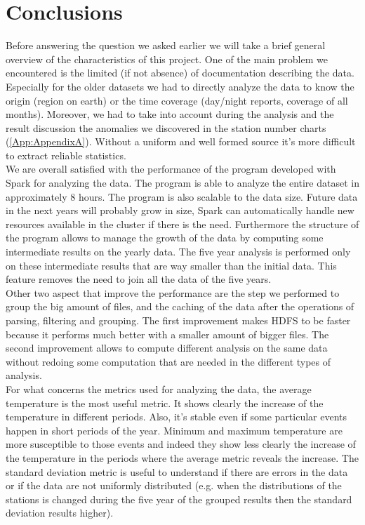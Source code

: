 \documentclass{vldb}
\begin{document}
\section{Conclusions}
\label{sec:con}
Before answering the question we asked earlier we will take a brief general overview of the characteristics of this project. One of the main problem we encountered is the limited (if not absence) of documentation describing the data. Especially for the older datasets we had to directly analyze the data to know the origin (region on earth) or the time coverage (day/night reports, coverage of all months). Moreover, we had to take into account during the analysis and the result discussion the anomalies we discovered in the station number charts (\ref{App:AppendixA}). Without a uniform and well formed source it's more difficult to extract reliable statistics.\\
We are overall satisfied with the performance of the program developed with Spark for analyzing the data. The program is able to analyze the entire dataset in approximately 8 hours. The program is also scalable to the data size. Future data in the next years will probably grow in size, Spark can automatically handle new resources available in the cluster if there is the need. Furthermore the structure of the program allows to manage the growth of the data by computing some intermediate results on the yearly data. The five year analysis is performed only on these intermediate results that are way smaller than the initial data. This feature removes the need to join all the data of the five years.\\
Other two aspect that improve the performance are the step we performed to group the big amount of files, and the caching of the data after the operations of parsing, filtering and grouping. The first improvement makes HDFS to be faster because it performs much better with a smaller amount of bigger files. The second improvement allows to compute different analysis on the same data without redoing some computation that are needed in the different types of analysis.\\

For what concerns the metrics used for analyzing the data, the average temperature is the most useful metric. It shows clearly the increase of the temperature in different periods. Also, it's stable even if some particular events happen in short periods of the year. Minimum and maximum temperature are more susceptible to those events and indeed they show less clearly the increase of the temperature in the periods where the average metric reveals the increase. The standard deviation metric is useful to understand if there are errors in the data or if the data are not uniformly distributed (e.g. when the distributions of the stations is changed during the five year of the grouped results then the standard deviation results higher).
\end{document}
